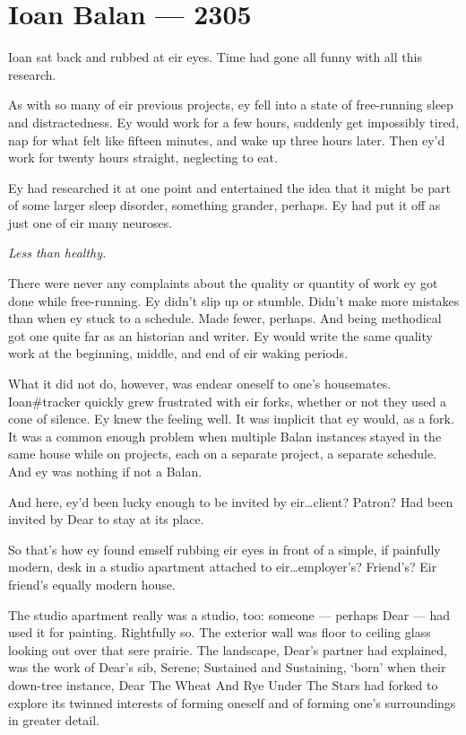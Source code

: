 \hypertarget{ioan-balan-2305}{%
\chapter*{Ioan Balan — 2305}\label{ioan-balan-2305}}

Ioan sat back and rubbed at eir eyes. Time had gone all funny with all this research.

As with so many of eir previous projects, ey fell into a state of free-running sleep and distractedness. Ey would work for a few hours, suddenly get impossibly tired, nap for what felt like fifteen minutes, and wake up three hours later. Then ey'd work for twenty hours straight, neglecting to eat.

Ey had researched it at one point and entertained the idea that it might be part of some larger sleep disorder, something grander, perhaps. Ey had put it off as just one of eir many neuroses.

\emph{Less than healthy.}

There were never any complaints about the quality or quantity of work ey got done while free-running. Ey didn't slip up or stumble. Didn't make more mistakes than when ey stuck to a schedule. Made fewer, perhaps. And being methodical got one quite far as an historian and writer. Ey would write the same quality work at the beginning, middle, and end of eir waking periods.

What it did not do, however, was endear oneself to one's housemates. Ioan\#tracker quickly grew frustrated with eir forks, whether or not they used a cone of silence. Ey knew the feeling well. It was implicit that ey would, as a fork. It was a common enough problem when multiple Balan instances stayed in the same house while on projects, each on a separate project, a separate schedule. And ey was nothing if not a Balan.

And here, ey'd been lucky enough to be invited by eir\ldots{}client? Patron? Had been invited by Dear to stay at its place.

So that's how ey found emself rubbing eir eyes in front of a simple, if painfully modern, desk in a studio apartment attached to eir\ldots{}employer's? Friend's? Eir friend's equally modern house.

The studio apartment really was a studio, too: someone — perhaps Dear — had used it for painting. Rightfully so. The exterior wall was floor to ceiling glass looking out over that sere prairie. The landscape, Dear's partner had explained, was the work of Dear's sib, Serene; Sustained and Sustaining, `born' when their down-tree instance, Dear The Wheat And Rye Under The Stars had forked to explore its twinned interests of forming oneself and of forming one's surroundings in greater detail.

